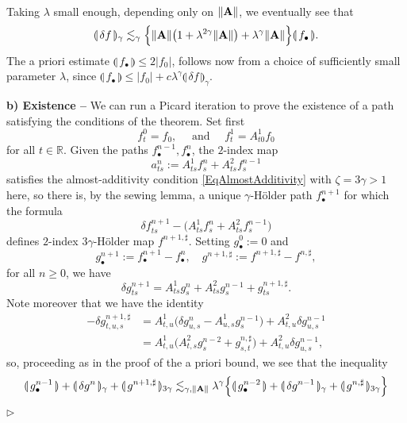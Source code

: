\documentclass[11pt,a4paper]{amsart}
\newcommand{\RR}{\mathbb{R}}  \newcommand{\CC}{\mathbb{C}}  \newcommand{\LL}{\mathbb{L}}  \newcommand{\WW}{\mathbb{W}}
\renewcommand{\leq}{\leqslant}
\renewcommand{\geq}{\geqslant}
\numberwithin{equation}{section} %
\newenvironment{Dem}{%
    \begin{list}{\hspace{0.5cm}{\sc Proof --}}{%
        \setlength{\topsep}{0pt}%
        \setlength{\leftmargin}{0pt}%
        \setlength{\rightmargin}{0pt}%
        \setlength{\listparindent}{0pt}%
        \setlength{\itemindent}{0pt}%
        \setlength{\parsep}{0pt}%
        \addtolength{\leftmargin}{20pt}%
        \addtolength{\rightmargin}{0pt}%
    } \item }{\hfill{\space $\rhd$}\end{list}\smallskip}
\begin{document}
\begin{Dem}
\begin{equation*}
\begin{split}
\end{split}
\end{equation*}
Taking $\lambda$ small enough, depending only on $\| \bf A \|$, we eventually see that 
$$ 
\llparenthesis\,\delta f \,\rrparenthesis_\gamma \lesssim_{\gamma}\Big\{\| {\bf A} \| \big(1 +  \lambda^{2 \gamma} \| {\bf A} \|\big) + \lambda^\gamma  \| {\bf A} \|\Big\} \llparenthesis\, f_\bullet\,\rrparenthesis.
$$
The a priori estimate $\llparenthesis\, f _\bullet\,\rrparenthesis \leqslant 2 | f_0 |$, follows now from a choice of sufficiently small  parameter $\lambda$, since $\llparenthesis\,f_\bullet \,\rrparenthesis \leq | f_0 | + c \lambda^\gamma \llparenthesis\, \delta f \,\rrparenthesis _\gamma$.

\bigskip

{\bf b) Existence --} We can run a Picard iteration to prove the existence of a path satisfying the conditions of the theorem. Set first
$$
f^0_t = f_0,\quad \textrm{ and } \quad f^1_t =A^1_{t0} f_0
$$ 
for all $t \in \RR$. Given the paths $f^{n-1}_\bullet, f^n_\bullet$, the $2$-index map 
$$
a^n_{ts} := A^1_{ts} f^n_s +A^2_{ts} f_s^{n - 1}
$$
satisfies the almost-additivity condition \eqref{EqAlmostAdditivity} with $\zeta=3\gamma>1$ here, so there is, by the sewing lemma, a unique $\gamma$-H\"older path $f^{n + 1}_\bullet$ for which the formula
$$ 
\delta f^{n + 1}_{ts} - \Big(A^1_{ts} f^n_s +A^2_{ts} f_s^{n - 1}\Big) 
$$
defines $2$-index $3\gamma$-H\"older map $f^{n + 1, \sharp}$. Setting $g^0_\bullet := 0$ and
$$
g^{n + 1}_\bullet := f^{n + 1}_\bullet - f^n_\bullet, \quad  g^{n + 1, \sharp} := f^{n + 1, \sharp} - f^{n, \sharp},
$$ 
for all $n \geq 0$, we have
$$
\delta g^{n + 1}_{ts} =A^1_{ts} g^n_s +A^2_{ts} g_s^{n - 1} + g^{n + 1, \sharp}_{ts}. 
$$
Note moreover that we have the identity
\begin{equation*}
\begin{split}
- \delta g^{n + 1, \sharp}_{t, u, s} &= A^1_{t, u} \Big(\delta  g^n_{u, s} -A^1_{u, s} g^{n - 1}_s\Big) +A^2_{t, u} \delta g^{n - 1}_{u, s} \\
&= A^1_{t, u} \Big(A^2_{t, s} g^{n - 2}_s + g^{n, \sharp}_{s, t}\Big) +A^2_{t, u} \delta g^{n - 1}_{u, s},
\end{split}
\end{equation*}
so, proceeding as in the proof of the a priori bound, we see that the inequality
$$
\llparenthesis\, g^{n - 1}_\bullet\,\rrparenthesis + \llparenthesis\, \delta g^n \,\rrparenthesis_\gamma + \llparenthesis\, g^{n + 1, \sharp} \,\rrparenthesis_{3 \gamma} \lesssim_{\gamma, \| {\bf A} \|} \lambda^\gamma \Big\{\llparenthesis\, g^{n - 2}_\bullet \,\rrparenthesis + \llparenthesis\, \delta g^{n - 1} \,\rrparenthesis_\gamma + \llparenthesis\, g^{n, \sharp} \,\rrparenthesis_{3 \gamma}\Big\}
$$
\end{Dem}
\end{document}
